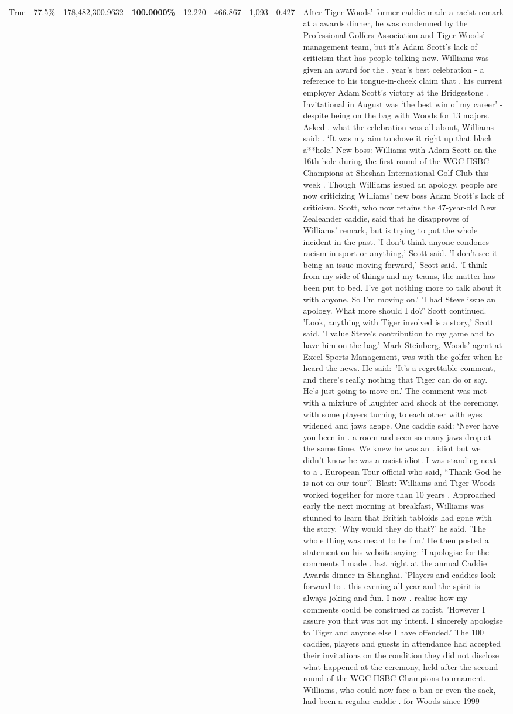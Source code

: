 \begin{table}[H]
\begin{tabular}{lllrlllll}
True & 77.5\% & 178,482,300.9632 & \bfseries \color{red} 100.0000\% & 12.220 & 466.867 & 1,093 & 0.427 & After Tiger Woods' former caddie made a racist remark at a awards dinner, he was condemned by the Professional Golfers Association and Tiger Woods' management team, but it's Adam Scott's lack of criticism that has people talking now. Williams was given an award for the . year’s best celebration - a reference to his tongue-in-cheek claim that . his current employer Adam Scott’s victory at the Bridgestone . Invitational in August was ‘the best win of my career’ - despite being on the bag with Woods for 13 majors. Asked . what the celebration was all about, Williams said: . ‘It was my aim to shove it right up that black a**hole.’ New boss: Williams with Adam Scott  on the 16th hole during the first round of the WGC-HSBC Champions at Sheshan International Golf Club this week . Though Williams issued an apology, people are now criticizing Williams' new boss Adam Scott's lack of criticism. Scott, who now retains the 47-year-old New Zealeander caddie, said that he disapproves of Williams' remark, but is trying to put the whole incident in the past. 'I don't think anyone condones racism in sport or anything,' Scott said. 'I don't see it being an issue moving forward,' Scott said. 'I think from my side of things and my teams, the matter has been put to bed. I've got nothing more to talk about it with anyone. So I'm moving on.' 'I had Steve issue an apology. What more should I do?' Scott continued. 'Look, anything with Tiger involved is a story,' Scott said. 'I value Steve's contribution to my game and to have him on the bag.' Mark Steinberg, Woods' agent at Excel Sports Management, was with the golfer when he heard the news. He said: 'It's a regrettable comment, and there's really nothing that Tiger can do or say. He's just going to move on.' The comment was met with a mixture of laughter and shock at the ceremony, with some players turning to each other with eyes widened and jaws agape. One caddie said: ‘Never have you been in . a room and seen so many jaws drop at the same time. We knew he was an . idiot but we didn’t know he was a racist idiot. I was standing next to a . European Tour official who said, “Thank God he is not on our tour”.’ Blast: Williams and Tiger Woods worked together for more than 10 years . Approached early the next morning at breakfast, Williams was stunned to learn that British tabloids had gone with the story. 'Why would they do that?' he said. 'The whole thing was meant to be fun.' He then posted a statement on his website saying: 'I apologise for the comments I made . last night at the annual Caddie Awards dinner in Shanghai. 'Players and caddies look forward to . this evening all year and the spirit is always joking and fun. I now . realise how my comments could be construed as racist. 'However I assure you that was not my intent. I sincerely apologise to Tiger and anyone else I have offended.' The 100 caddies, players and guests in attendance had accepted their invitations on the condition they did not disclose what happened at the ceremony, held after the second round of the WGC-HSBC Champions tournament. Williams, who could now face a ban or even the sack, had been a regular caddie . for Woods since 1999 
\end{tabular}
\end{table}
